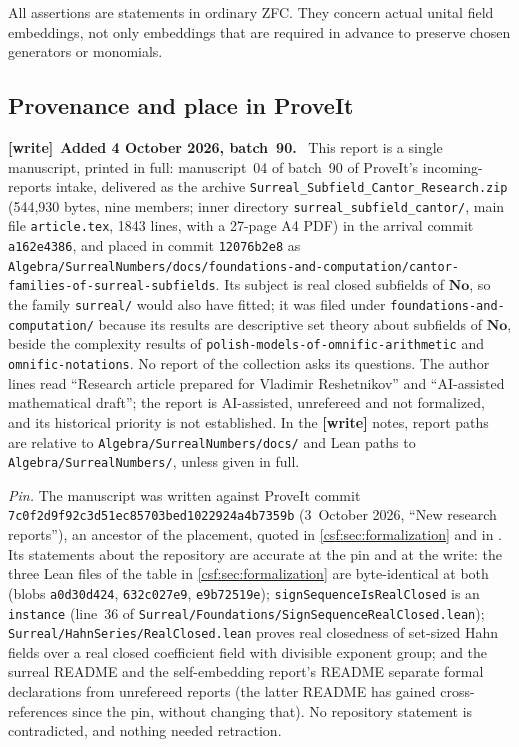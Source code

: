 \documentclass[11pt,a4paper]{article}
\numberwithin{equation}{section}
\theoremstyle{definition}
\theoremstyle{remark}
\newcommand{\No}{\mathbf{No}}
\newcommand{\repo}[1]{\nolinkurl{#1}}
\newenvironment{writenote}[1][]{\par\smallskip\begingroup\small\raggedright
 \setlength{\parindent}{1.25em}\noindent\textbf{[write]}\if\relax\detokenize{#1}\relax\else~\textbf{#1.}\fi\ }%
 {\par\endgroup\smallskip}
\begin{document}
All assertions are statements in ordinary ZFC. They concern actual unital
field embeddings, not only embeddings that are required in advance to
preserve chosen generators or monomials.

\subsection{Provenance and place in ProveIt}
\label{csf:sec:provenance}

\begin{writenote}[Added 4 October 2026, batch~90]
This report is a single manuscript, printed in full: manuscript~04 of batch~90 of ProveIt's incoming-reports intake, delivered as the archive \texttt{Surreal\_\allowbreak Subfield\_\allowbreak Cantor\_\allowbreak Research.zip} (544,930 bytes, nine members; inner directory \texttt{surreal\_\allowbreak subfield\_\allowbreak cantor/}, main file \texttt{article.tex}, 1843 lines, with a 27-page A4 PDF) in the arrival commit \texttt{a162e4386}, and placed in commit \texttt{12076b2e8} as \repo{Algebra/SurrealNumbers/docs/foundations-and-computation/cantor-families-of-surreal-subfields}. Its subject is real closed subfields of $\No$, so the family \texttt{surreal/} would also have fitted; it was filed under \texttt{foundations-and-computation/} because its results are descriptive set theory about subfields of $\No$, beside the complexity results of \repo{polish-models-of-omnific-arithmetic} and \repo{omnific-notations}. No report of the collection asks its questions. The author lines read ``Research article prepared for Vladimir Reshetnikov'' and ``AI-assisted mathematical draft''; the report is AI-assisted, unrefereed and not formalized, and its historical priority is not established. In the \textbf{[write]} notes, report paths are relative to \repo{Algebra/SurrealNumbers/docs/} and Lean paths to \repo{Algebra/SurrealNumbers/}, unless given in full.

\emph{Pin.} The manuscript was written against ProveIt commit \texttt{7c0f2d9f92c3d51ec85703bed1022924a4b7359b} (3~October 2026, ``New research reports''), an ancestor of the placement, quoted in \cref{csf:sec:formalization} and in \cite{proveit}. Its statements about the repository are accurate at the pin and at the write: the three Lean files of the table in \cref{csf:sec:formalization} are byte-identical at both (blobs \texttt{a0d30d424}, \texttt{632c027e9}, \texttt{e9b72519e}); \texttt{signSequenceIsRealClosed} is an \texttt{instance} (line~36 of \repo{Surreal/Foundations/SignSequenceRealClosed.lean}); \repo{Surreal/HahnSeries/RealClosed.lean} proves real closedness of set-sized Hahn fields over a real closed coefficient field with divisible exponent group; and the surreal README and the self-embedding report's README separate formal declarations from unrefereed reports (the latter README has gained cross-references since the pin, without changing that). No repository statement is contradicted, and nothing needed retraction.


\end{writenote}
\end{document}
